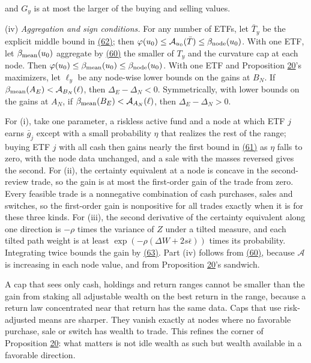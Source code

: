 \documentclass[11pt]{article}
\begin{document}
and \(G_y\) is at most the larger of the buying and selling
values.

(iv) \emph{Aggregation and sign conditions.} For any number of ETFs,
let \(\bar T_y\) be the explicit middle bound in \hyperref[eq:62]{(62)}; then
\(\varphi(u_0)\leq\mathcal A_{u_0}(\bar T)\leq
\beta_{\rm node}(u_0)\). With one ETF, let
\(\beta_{\rm mean}(u_0)\) aggregate by \hyperref[eq:60]{(60)} the smaller of
\(T_y\) and the curvature cap at each node. Then
\(\varphi(u_0)\leq\beta_{\rm mean}(u_0)\leq
\beta_{\rm node}(u_0)\).
With one ETF and Proposition \hyperref[res:Proposition-20]{20}'s maximizers, let \(\ell_y\) be
any node-wise lower bounds on the gains at \(B_N\). If
\(\beta_{\rm mean}(A_E)<\mathcal A_{B_N}(\ell)\), then
\(\Delta_E-\Delta_N<0\). Symmetrically, with lower bounds on
the gains at \(A_N\), if
\(\beta_{\rm mean}(B_E)<\mathcal A_{A_N}(\ell)\), then
\(\Delta_E-\Delta_N>0\).

For (i), take one parameter, a riskless active fund and a node
at which ETF \(j\) earns \(\bar g_j\) except with a small
probability \(\eta\) that realizes the rest of the range; buying ETF \(j\) with
all cash then gains nearly the first bound in \hyperref[eq:61]{(61)} as \(\eta\)
falls to zero, with the node data unchanged, and a sale with the
masses reversed gives the second. For (ii), the certainty
equivalent at a node is concave in the second-review trade, so
the gain is at most the first-order gain of the trade from
zero. Every feasible trade is a nonnegative combination of cash
purchases, sales and switches, so the first-order gain is
nonpositive for all trades exactly when it is for these three
kinds. For (iii), the second derivative of the certainty
equivalent along one direction is \(-\rho\) times the variance
of \(Z\) under a tilted measure, and each tilted path weight is
at least \(\exp(-\rho(\Delta W+2s\bar\epsilon))\) times its
probability. Integrating twice bounds the gain by \hyperref[eq:63]{(63)}. Part
(iv) follows from \hyperref[eq:60]{(60)}, because \(\mathcal A\) is increasing in
each node value, and from Proposition \hyperref[res:Proposition-20]{20}'s sandwich.

A cap that sees only cash, holdings and return ranges cannot be
smaller than the gain from staking all adjustable wealth on the
best return in the range, because a return law concentrated near
that return has the same data. Caps that use risk-adjusted means
are sharper. They vanish exactly at nodes where no favorable
purchase, sale or switch has wealth to trade. This refines the
corner of Proposition \hyperref[res:Proposition-20]{20}: what matters is not idle wealth as
such but wealth available in a favorable direction.
\end{document}
